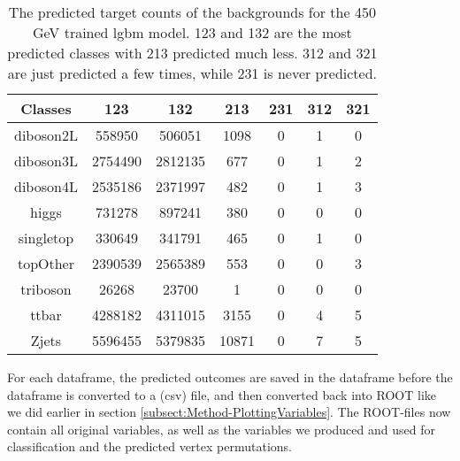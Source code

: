 \documentclass[a4paper, american, 12pt]{report}
\begin{document}
	\begin{table}[htbp!]
		\centering
		\begin{tabular}{ |c|c|c|c|c|c|c| }
			\hline \rule{0pt}{13pt}
			Classes & 123 & 132 & 213 & 231 & 312 & 321 \\
			\hline \rule{0pt}{13pt}
			diboson2L & 558950 & 506051 & 1098 & 0 & 1 & 0 \\
			\hline \rule{0pt}{13pt}
			diboson3L & 2754490 & 2812135 & 677 & 0 & 1 & 2 \\
			\hline \rule{0pt}{13pt}
			diboson4L & 2535186 & 2371997 & 482 & 0 & 1 & 3 \\
			\hline \rule{0pt}{13pt}
			higgs & 731278 & 897241 & 380 & 0 & 0 & 0 \\
			\hline \rule{0pt}{13pt}
			singletop & 330649 & 341791 & 465 & 0 & 1 & 0 \\
			\hline \rule{0pt}{13pt}
			topOther & 2390539 & 2565389 & 553 & 0 & 0 & 3 \\
			\hline \rule{0pt}{13pt}
			triboson & 26268 & 23700 & 1 & 0 & 0 & 0 \\
			\hline \rule{0pt}{13pt}
			ttbar & 4288182 & 4311015 & 3155 & 0 & 4 & 5 \\
			\hline \rule{0pt}{13pt}
			Zjets & 5596455 & 5379835 & 10871 & 0 & 7 & 5 \\
			\hline
		\end{tabular}	      
		\caption[Target counts of backgrounds for 450 GeV trained classifier.]{The predicted target counts of the backgrounds for the 450 GeV trained \acrshort{lgbm} model. 123 and 132 are the most predicted classes with 213 predicted much less. 312 and 321 are just predicted a few times, while 231 is never predicted.}
		\label{tab:Counts_450_Ntuples}
	\end{table}
	
	
	For each dataframe, the predicted outcomes are saved in the dataframe before the dataframe is converted to a (\acrshort{csv}) file, and then converted back into ROOT like we did earlier in section \ref{subsect:Method-PlottingVariables}. The ROOT-files now contain all original variables, as well as the variables we produced and used for classification and the predicted vertex permutations. 
	
	
\end{document}
